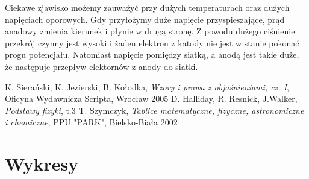 \documentclass[paper=a4, fontsize=12pt]{scrartcl}
\begin{document}
Ciekawe zjawisko możemy zauważyć przy dużych temperaturach oraz dużych napięciach oporowych. Gdy przyłożymy duże napięcie przyspieszające, prąd anadowy zmienia kierunek i płynie w drugą stronę. Z powodu dużego ciśnienie przekrój czynny jest wysoki i żaden elektron z katody nie jest w stanie pokonać progu potencjału. Natomiast napięcie pomiędzy siatką, a anodą jest takie duże, że następuje przepływ elektornów z anody do siatki.

\begin{thebibliography}{99}
	K. Sierański, K. Jezierski, B. Kołodka, \textit{ Wzory i prawa z objaśnieniami, cz. I}, Oficyna  Wydawnicza Scripta, Wrocław 2005
	 D. Halliday, R. Resnick, J.Walker, \textit{Podstawy fizyki}, t.3 
	T. Szymczyk, \emph{Tablice matematyczne, fizyczne, astronomiczne i chemiczne}, PPU "PARK", Bielsko-Biała 2002
\end{thebibliography}
\section{Wykresy}
\end{document}
